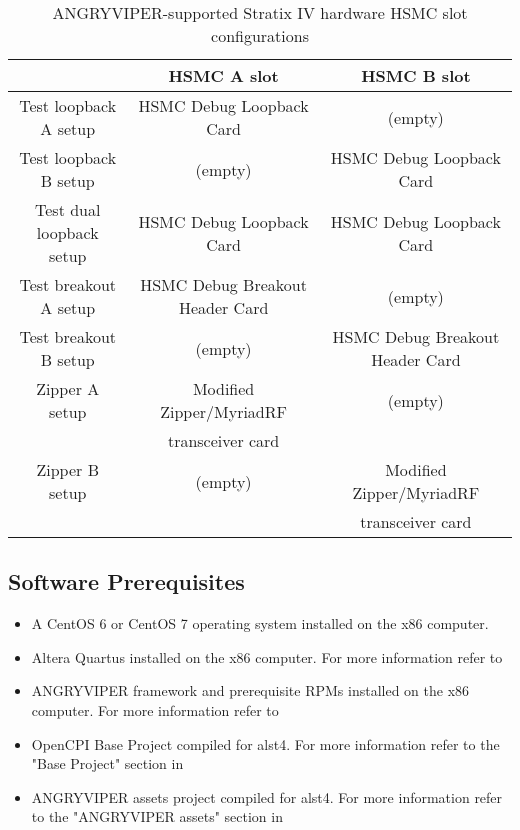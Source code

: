 \documentclass{article}
\begin{document}
\begin{center}
        \begin{table}[!htbp]
        \centering
        \caption{ANGRYVIPER-supported Stratix IV hardware HSMC slot configurations}
        \label{table:supported_slots}
        \begin{tabular}{c|c|c|}
                \cline{2-3}
                & HSMC A slot & HSMC B slot \\ \hline
                \multicolumn{1}{|c|}{Test loopback A setup} & HSMC Debug Loopback Card & (empty)\\ \hline
                \multicolumn{1}{|c|}{Test loopback B setup} & (empty) & HSMC Debug Loopback Card \\ \hline
                \multicolumn{1}{|c|}{Test dual loopback setup} & HSMC Debug Loopback Card & HSMC Debug Loopback Card \\ \hline
                \multicolumn{1}{|c|}{Test breakout A setup} & HSMC Debug Breakout Header Card & (empty)\\ \hline
                \multicolumn{1}{|c|}{Test breakout B setup} & (empty) & HSMC Debug Breakout Header Card \\ \hline
                \multicolumn{1}{|c|}{Zipper A setup} & Modified\cite{zipper_mods} Zipper/MyriadRF & (empty)\\
                \multicolumn{1}{|c|}{ } & transceiver card & \\ \hline
                \multicolumn{1}{|c|}{Zipper B setup} & (empty) & Modified\cite{zipper_mods} Zipper/MyriadRF \\
                \multicolumn{1}{|c|}{ } & & transceiver card \\ \hline
        \end{tabular}
        \end{table}
\end{center}

\subsection*{Software Prerequisites}
\begin{itemize}
\item A CentOS 6 or CentOS 7 operating system installed on the x86 computer.
\item Altera Quartus installed on the x86 computer. For more information refer to \cite{angryviper_fpga_vendor_tool_guide}
\item ANGRYVIPER framework and prerequisite RPMs installed on the x86 computer. For more information refer to \cite{angryviper_installation_guide}
\item OpenCPI Base Project compiled for alst4. For more information refer to the "Base Project" section in \cite{angryviper_installation_guide}
\item ANGRYVIPER assets project compiled for alst4. For more information refer to the "ANGRYVIPER assets" section in \cite{angryviper_installation_guide}
\end{itemize}
\end{document}
